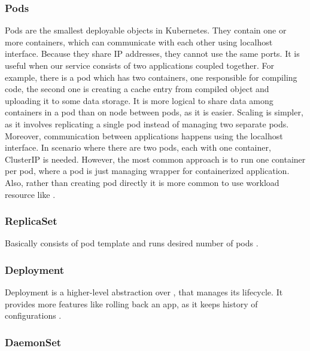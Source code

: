 \subsubsection{Pods}
\label{sec:pods}

Pods are the smallest deployable objects in Kubernetes. They contain one or more containers, which can communicate with each other using localhost interface. Because they share IP addresses, they cannot use the same ports. It is useful when our service consists of two applications coupled together. For example, there is a pod which has two containers, one responsible for compiling code, the second one is creating a cache entry from compiled object and uploading it to some data storage. It is more logical to share data among containers in a pod than on node between pods, as it is easier. Scaling is simpler, as it involves replicating a single pod instead of managing two separate pods. Moreover, communication between applications happens using the localhost interface. In scenario where there are two pods, each with one container, ClusterIP \textit{} is needed. However, the most common approach is to run one container per pod, where a pod is just managing wrapper for containerized application. Also, rather than creating pod directly it is more common to use workload resource like \textit{} \cite{KubernetesPods}. 


\subsubsection{ReplicaSet}
\label{replicaset}

Basically \textit{} consists of pod template and runs desired number of pods \cite{KubernetesReplicaSet}. 


\subsubsection{Deployment}
\label{deployment}

Deployment is a higher-level abstraction over \textit{}, that manages its lifecycle. It provides more features like rolling back an app, as it keeps history of configurations \cite{KubernetesDeployments}.

\subsubsection{DaemonSet}
\label{daemonset}

